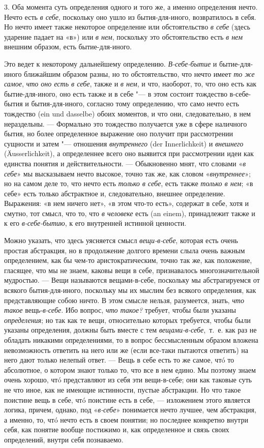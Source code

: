 3. Оба момента суть определения одного и того же, а именно определения
нечто. Нечто есть {\em в себе}, поскольку оно ушло из
бытия-для-иного, возвратилось в себя. Но нечто имеет также некоторое
определение или обстоятельство {\em в себе} (здесь
ударение падает на «в») или {\em в нем}, поскольку это
обстоятельство есть {\em в нем} внешним образом, есть
бытие-для-иного.

Это ведет к некоторому дальнейшему определению.
{\em В-себе-бытие} и бытие-для-иного ближайшим
образом разны, но то обстоятельство, что нечто имеет
{\em то же самое}, {\em что оно
есть в себе}, также и {\em в нем}, и что, наоборот, то,
что оно есть как бытие-для-иного, оно есть также и в себе "--- в этом
состоит тождество в-себе-бытия и бытия-для-иного, согласно тому
определению, что само нечто есть тождество (ein und dasselbe) обоих
моментов, и что они, следовательно, в нем нераздельны. --- Формально это
тождество получается уже в сфере наличного бытия, но более определенное
выражение оно получит при рассмотрении сущности и затем "--- отношения
{\em внутреннего} (der Innerlichkeit) и
{\em внешнего} (Äusserlichkeit), а определеннее всего
оно выявится при рассмотрении идеи как единства понятия и действительности.
--- Обыкновенно мнят, что словами «{\em в себе}» мы
высказываем нечто высокое, точно так же, как словом
«{\em внутреннее}»; но на самом деле то, что нечто есть
{\em только в себе}, есть также
{\em только в нем}; «в себе» есть только абстрактное и,
следовательно, внешнее определение. Выражения: «в нем ничего нет», «в этом
что-то есть», содержат в себе, хотя и смутно, тот смысл, что то, что
{\em в человеке} есть (an einem), принадлежит также и к
его {\em в-себе-бытию}, к его внутренней истинной
ценности.

Можно указать, что здесь уясняется смысл
{\em вещи-в-себе}, которая есть очень простая
абстракция, но в продолжение долгого времени слыла очень важным
определением, как бы чем-то аристократическим, точно так же, как положение,
гласящее, что мы не знаем, каковы вещи в себе, признавалось
многозначительной мудростью. — Вещи называются вещами-в-себе, поскольку мы
абстрагируемся от всякого бытия-для-иного, поскольку мы их мыслим без
всякого определения, как представляющие собою ничто. В этом смысле нельзя,
разумеется, знать, {\em что такое}
вещь-{\em в-себе}. Ибо вопрос,
{\em что такое?} требует, чтобы были указаны
{\em определения}; но так как те вещи, относительно
которых требуется, чтобы были указаны определения, должны быть вместе с тем
{\em вещами-в-себе},~т.~е. как раз не обладать никакими
определениями, то в вопрос бессмысленным образом вложена невозможность
ответить на него или же (если все-таки пытаются ответить) на него дают
только нелепый ответ. — Вещь в себе есть то же самое, чтó то абсолютное, о
котором знают только то, что все в нем едино. Мы поэтому знаем очень
хорошо, чтó представляют из себя эти вещи-в-себе; они как таковые суть не
что иное, как не имеющие истинности, пустые абстракции. Но что такое
поистине вещь в себе, чтó поистине есть в себе, — изложением этого является
логика, причем, однако, под «{\em в-себе}» понимается
нечто лучшее, чем абстракция, а именно, то, чтó нечто есть в своем понятии;
но последнее конкретно внутри себя, как понятие вообще постижимо и, как
определенное и связь своих определений, внутри себя познаваемо.

